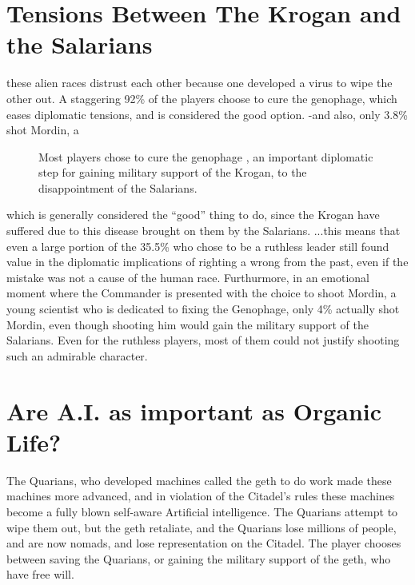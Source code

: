 \documentclass[journal]{IEEEtran}
\begin{document}
\section{Tensions Between The Krogan and the Salarians}
these alien races distrust each other because one developed a virus to wipe the
other out. A staggering 92\% of the players choose to cure the genophage, which
eases diplomatic tensions, and is considered the good option. -and also,
only 3.8\% shot Mordin, a
\begin{figure}
 \begin{adjustbox}{width=.4\textwidth}
 \end{adjustbox}
 \caption{Most players chose to cure the genophage \cite{ea}, an important diplomatic step for gaining military support of the Krogan, to the disappointment of the Salarians.}
\end{figure}
which is generally considered the ``good'' thing to do, since the Krogan have suffered due to this disease brought on them by the Salarians.
...this means that even a large portion of the 35.5\% who chose
to be a ruthless leader still found value in the diplomatic implications
of righting a wrong from the past, even if the mistake was not a cause
of the human race. Furthurmore, in an emotional moment where the Commander is
presented with the choice to shoot Mordin, a young scientist who is dedicated
to fixing the Genophage, only 4\% actually shot Mordin, even though shooting him would gain the military support of the Salarians. Even for the ruthless players, most of them could not justify shooting such an admirable character.
\section{Are A.I. as important as Organic Life?}
The Quarians, who developed machines called the geth to do work made these
machines more advanced, and in violation of the Citadel's rules these machines
become a fully blown self-aware Artificial intelligence. The Quarians attempt to wipe them out, but the geth retaliate, and the Quarians lose millions of people, and are now nomads, and lose representation on the Citadel.
The player chooses between saving the Quarians, or gaining the military support of the geth, who have free will.
\end{document}
